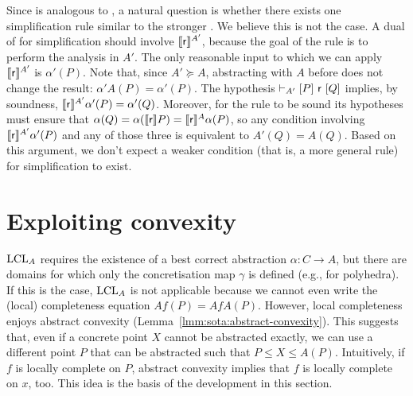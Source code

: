 Since  is analogous to , a natural question is whether there exists one simplification rule similar to the stronger . We believe this is not the case.
A dual of  for simplification should involve $\llbracket\mathsf{r}\rrbracket^{A'}$, because the goal of the rule is to perform the analysis in $A'$. The only reasonable input to which we can apply $\llbracket\mathsf{r}\rrbracket^{A'}$ is $\alpha'(P)$. Note that, since $A' \succeq A$, abstracting with $A$ before does not change the result: $\alpha' A(P) = \alpha'(P)$. The hypothesis $\vdash_{A'}\nobreak[P]~\mathsf{r}~[Q]$ implies, by soundness, $\llbracket\mathsf{r}\rrbracket^{A'} \alpha'(P) = \alpha'(Q)$. Moreover, for the rule to be sound its hypotheses must ensure that $\alpha(Q) = \alpha(\llbracket\mathsf{r}\rrbracket P) = \llbracket\mathsf{r}\rrbracket^{A} \alpha(P)$, so any condition involving $\llbracket\mathsf{r}\rrbracket^{A'} \alpha'(P)$ and any of those three is equivalent to $A'(Q) = A(Q)$.
Based on this argument, we don't expect a weaker condition (that is, a more general rule) for simplification to exist.

\section{Exploiting convexity}\label{sec:lcla:no-alpha}
$\text{LCL}_A$ requires the existence of a best correct abstraction $\alpha : C \rightarrow A$, but there are domains for which only the concretisation map $\gamma$ is defined (e.g., for polyhedra). If this is the case, $\text{LCL}_A$ is not applicable because we cannot even write the (local) completeness equation $A f(P) = A f A(P)$.
However, local completeness enjoys abstract convexity (Lemma~\ref{lmm:sota:abstract-convexity}). This suggests that, even if a concrete point $X$ cannot be abstracted exactly, we can use a different point $P$ that can be abstracted such that $P \le X \le A(P)$. Intuitively, if $f$ is locally complete on $P$, abstract convexity implies that $f$ is locally complete on $x$, too. This idea is the basis of the development in this section.

